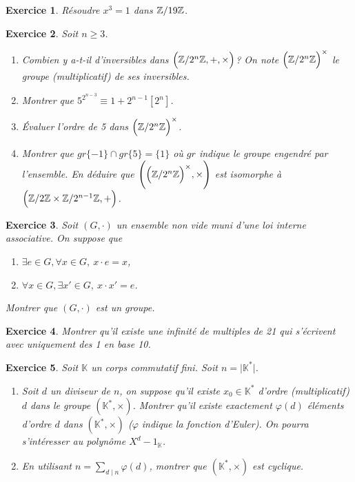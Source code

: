 \documentclass[12pt]{article}
\newtheorem{exercise}{Exercice}[section]
\theoremstyle{remark}
\theoremstyle{remark}
\newcommand{\K}{\mathbb{K}} \newcommand{\R}{\mathbb{R}}
\begin{document}
\begin{exercise}
	Résoudre $x^{3}=1$ dans $\mathbb{Z}/19\mathbb{Z}$.
\end{exercise}

\begin{exercise}
	Soit $n\geqslant 3$.
	\begin{enumerate}
		\item
		Combien y a-t-il d'inversibles dans $\Bigl(\mathbb{Z}/2^{n}\mathbb{Z},+,\times\Bigr)$? On
		note $\Bigl(\mathbb{Z}/2^{n}\mathbb{Z}\Bigr)^{\times}$ le groupe (multiplicatif) de ses
		inversibles.
		\item
		Montrer que $5^{2^{n-3}}\equiv 1+2^{n-1}[2^{n}]$.
		\item
		Évaluer l'ordre de 5 dans $\Bigl(\mathbb{Z}/2^{n}\mathbb{Z}\Bigr)^{\times}$.
		\item
		Montrer que $gr\{-1\}\cap gr\{5\}=\{1\}$ où $gr$ indique le groupe
		engendré par l'ensemble. En déduire que
		$\Biggl(\Bigl(\mathbb{Z}/2^{n}\mathbb{Z}\Bigr)^{\times},\times\Biggr)$ est isomorphe à
		$\Bigl(\mathbb{Z}/2\mathbb{Z}\times\mathbb{Z}/2^{n-1}\mathbb{Z},+\Bigr)$.
	\end{enumerate}
\end{exercise}

\begin{exercise}
	Soit $(G,\cdot)$ un ensemble non vide muni d'une loi interne associative. On
	suppose que
	\begin{enumerate}
		\item
		[(i)] $\exists e\in G,\forall x\in G,~x\cdot e=x$,
		\item
		[(ii)] $\forall x\in G,\exists x'\in G,~x\cdot x'=e$.
	\end{enumerate}
	Montrer que $(G,\cdot)$ est un groupe.
\end{exercise}

\begin{exercise}
	Montrer qu'il existe une infinité de multiples de 21 qui s'écrivent avec
	uniquement des 1 en base 10.
\end{exercise}

\begin{exercise}
	Soit $\K$ un corps commutatif fini. Soit $n=\vert \K^{*}\vert$.
	\begin{enumerate}
		\item
		Soit $d$ un diviseur de $n$, on suppose qu'il existe $x_{0}\in \K^{*}$
		d'ordre (multiplicatif) $d$ dans le groupe $(\K^{*},\times)$. Montrer
		qu'il existe exactement $\varphi(d)$ éléments d'ordre $d$ dans
		$(\K^{*},\times)$ ($\varphi$ indique la fonction d'Euler). On pourra
		s'intéresser au polynôme $X^{d}-1_{\K}$.
		\item
		En utilisant $n=\sum_{d\mid n}\varphi(d)$, montrer que $(\K^{*},\times)$
		est cyclique.
	\end{enumerate}
\end{exercise}
\end{document}
